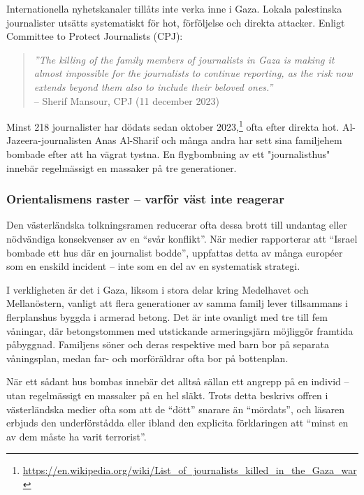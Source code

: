 \documentclass[12pt]{article}
\begin{document}
Internationella nyhetskanaler tillåts inte verka inne i Gaza. Lokala palestinska journalister utsätts systematiskt för hot, förföljelse och direkta attacker. Enligt Committee to Protect Journalists (CPJ):

\begin{quote}
\textit{”The killing of the family members of journalists in Gaza is making it almost impossible for the journalists to continue reporting, as the risk now extends beyond them also to include their beloved ones.”} \\
\textup{– Sherif Mansour, CPJ (11 december 2023)}
\end{quote}

Minst 218 journalister har dödats sedan oktober 2023,\footnote{\url{https://en.wikipedia.org/wiki/List_of_journalists_killed_in_the_Gaza_war}} ofta efter direkta hot. Al-Jazeera-journalisten Anas Al-Sharif och många andra har sett sina familjehem bombade efter att ha vägrat tystna. En flygbombning av ett "journalisthus" innebär regelmässigt en massaker på tre generationer.

\subsubsection*{Orientalismens raster – varför väst inte reagerar}
Den västerländska tolkningsramen reducerar ofta dessa brott till undantag eller nödvändiga konsekvenser av en \enquote{svår konflikt}. När medier rapporterar att \enquote{Israel bombade ett hus där en journalist bodde}, uppfattas detta av många européer som en enskild incident – inte som en del av en systematisk strategi.

I verkligheten är det i Gaza, liksom i stora delar kring Medelhavet och Mellanöstern, vanligt att flera generationer av samma familj lever tillsammans i flerplanshus byggda i armerad betong. Det är inte ovanligt med tre till fem våningar, där betongstommen med utstickande armeringsjärn möjliggör framtida påbyggnad. Familjens söner och deras respektive med barn bor på separata våningsplan, medan far- och morföräldrar ofta bor på bottenplan.

När ett sådant hus bombas innebär det alltså sällan ett angrepp på en individ – utan regelmässigt en massaker på en hel släkt. Trots detta beskrivs offren i västerländska medier ofta som att de \enquote{dött} snarare än \enquote{mördats}, och läsaren erbjuds den underförstådda eller ibland den explicita förklaringen att \enquote{minst en av dem måste ha varit terrorist}.
\end{document}
